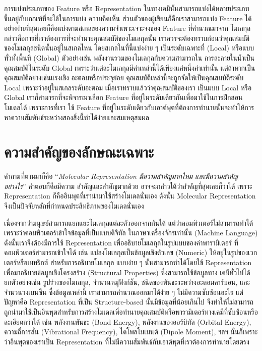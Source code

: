 การแบ่งประเภทของ Feature หรือ Representation ในทางเคมีนั้นสามารถแบ่งได้หลายประเภท ขึ้นอยู่กับเกณฑ์ที่จะใช้ในการแบ่ง ความคิดเห็น%
ส่วนตัวของผู้เขียนก็คือเราสามารถแบ่ง Feature ได้อย่างง่ายที่สุดเลยก็คือแบ่งตามสเกลของความจำเพาะเจาะจงของ Feature ที่คำนวณมาจาก%
โมเลกุล กล่าวคือการที่เราต้องการที่จะทำนายคุณสมบัติของโมเลกุลนั้น เราควรจะต้องทราบก่อนว่าคุณสมบัติของโมเลกุลชนิดนั้นอยู่ในสเกลไหน 
โดยสเกลในที่นี้แบ่งง่าย ๆ เป็นระดับเฉพาะที่ (Local) หรือแบบทั่วทั้งพื้นที่ (Global) ตัวอย่างเช่น พลังงานรวมของโมเลกุลกับความสามารถใน%
การละลายในน้ำเป็นคุณสมบัติในระดับ Global เพราะว่าแต่ละโมเลกุลมีค่าเหล่านี้ได้เพียงแค่หนึ่งค่าเท่านั้น แต่ถ้าหากเป็นคุณสมบัติอย่างเช่นแรงเชิง%
อะตอมหรือประจุย่อย คุณสมบัติเหล่านี้จะถูกจัดให้เป็นคุณสมบัติระดับ Local เพราะว่าอยู่ในสเกลระดับอะตอม เมื่อเราทราบแล้วว่าคุณสมบัติของเรา%
เป็นแบบ Local หรือ Global เราก็สามารถที่จะพิจารณาเลือก Feature ที่อยู่ในระดับเดียวกันเพื่อมาใช้ในการฝึกสอนโมเดลได้ เพราะการที่เรา%
ใช้ Feature ที่อยู่ในระดับเดียวกับเอาต์พุตที่ต้องการทำนายนั้นจะทำให้การหาความสัมพันธ์ระหว่างสองสิ่งนี้ทำได้ง่ายและสมเหตุสมผล

\section{ความสำคัญของลักษณะเฉพาะ}
\label{sec:why_feature}

คำถามที่ตามมาก็คือ \enquote{\textit{Molecular Representation มีความสำคัญมากไหม และมีความสำคัญอย่างไร}} คำตอบก็คือมีความ%
สำคัญและสำคัญมากด้วย อาจจะกล่าวได้ว่าสำคัญที่สุดเลยก็ว่าได้ เพราะ Representation ก็คืออินพุตที่เรานำมาใช้สร้างโมเดลนั่นเอง 
ดังนั้น Molecular Representation จึงเป็นปัจจัยหลักที่กำหนดประสิทธิภาพของโมเดลนั่นเอง 

เนื่องจากว่ามนุษย์สามารถแยกแยะโมเลกุลแต่ละตัวออกจากกันได้ แต่ว่าคอมพิวเตอร์ไม่สามารถทำได้เพราะว่าคอมพิวเตอร์เข้าใจข้อมูลที่เป็นแบบดิจิทัล%
ในภาษาเครื่องจักรเท่านั้น (Machine Language) ดังนั้นเราจึงต้องมีการใช้ Representation เพื่ออธิบายโมเลกุลในรูปแบบของค่าพารามิเตอร์%
ที่คอมพิวเตอร์สามารถเข้าใจได้ เช่น แปลงโมเลกุลเป็นข้อมูลเชิงตัวเลข (Numeric) ให้อยู่ในรูปของเวกเตอร์หรือเมทริกซ์ สำหรับการอธิบายโมเลกุล%
แบบง่าย ๆ นั้นสามารถทำได้โดยใช้ Representation เพื่อมาอธิบายข้อมูลเชิงโครงสร้าง (Structural Properties) ซึ่งสามารถใช้ข้อมูลทาง%
เคมีทั่วไปได้ ยกตัวอย่างเช่น รูปร่างของโมเลกุล, จำนวนหมู่ฟังก์ชัน, ชนิดของพันธะระหว่างอะตอมคาร์บอน, และจำนวนวงเบนซีน ซึ่งข้อมูลเหล่านี้%
เราสามารถคำนวณออกมาได้ง่าย ๆ ไม่มีความซับซ้อนอะไร แต่ปัญหาคือ Representation ที่เป็น Structure-based นั้นมีข้อมูลที่น้อยเกินไป 
จึงทำให้ไม่สามารถถูกนำมาใช้เป็นอินพุตสำหรับการสร้างโมเดลเพื่อทำนายคุณสมบัติหรือพารามิเตอร์ทางเคมีที่ซับซ้อนหรือละเอียดกว่าได้ เช่น 
พลังงานพันธะ (Bond Energy), พลังงานของออร์บิทัล (Orbital Energy), ความถี่การสั่น (Vibrational Frequency), ไดโพลโมเมนต์ 
(Dipole Moment), ฯลฯ นั่นก็เพราะว่าอินพุตของเราเป็น Representation ที่ไม่มีความสัมพันธ์กับเอาต์พุตที่เราต้องการทำนายโดยตรง

